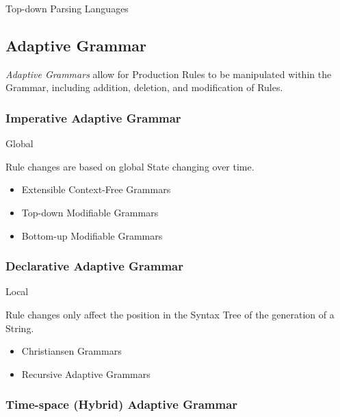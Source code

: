 Top-down Parsing Languages



\subsection{Adaptive Grammar}\label{sec:adaptive_grammar}

\emph{Adaptive Grammars} allow for Production Rules to be manipulated
within the Grammar, including addition, deletion, and modification of
Rules.



\subsubsection{Imperative Adaptive Grammar}
\label{sec:imperative_adaptive}

Global

Rule changes are based on global State changing over time.

\begin{itemize}
  \item Extensible Context-Free Grammars
  \item Top-down Modifiable Grammars
  \item Bottom-up Modifiable Grammars
\end{itemize}



\subsubsection{Declarative Adaptive Grammar}
\label{sec:declarative_adaptive}

Local

Rule changes only affect the position in the Syntax Tree of the
generation of a String.

\begin{itemize}
  \item Christiansen Grammars
  \item Recursive Adaptive Grammars
\end{itemize}



\subsubsection{Time-space (Hybrid) Adaptive Grammar}
\label{sec:timespace_adaptive}

